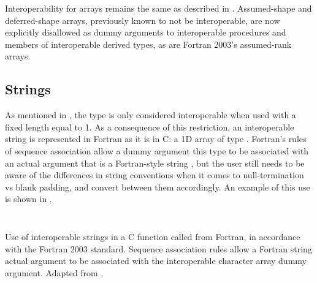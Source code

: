 Interoperability for arrays remains the same as described in . Assumed-shape and deferred-shape arrays, previously known to not be interoperable, are now explicitly disallowed as dummy arguments to interoperable procedures and members of interoperable derived types, as are Fortran 2003's assumed-rank arrays.

\subsection{Strings} \label{sec:interop_f03_strings}

As mentioned in , the  type is only considered interoperable when used with a fixed length equal to 1. As a consequence of this restriction, an interoperable string is represented in Fortran as it is in C: a 1D array of type . Fortran's rules of sequence association allow a dummy argument this type to be associated with an actual argument that is a Fortran-style string \cite{F2003standard}, but the user still needs to be aware of the differences in string conventions when it comes to null-termination vs blank padding, and convert between them accordingly. An example of this use is shown in .

\begin{listing}
	\inputminted{C}{src/f03/strings/csrc.c}
	\inputminted{Fortran}{src/f03/strings/fsrc.f90}
	\caption{Use of interoperable strings in a C function called from Fortran, in accordance with the Fortran 2003 standard. Sequence association rules allow a Fortran string actual argument to be associated with the interoperable character array dummy argument. Adapted from \cite{F2003standard}.}
	\label{src:f03_strings}
\end{listing}